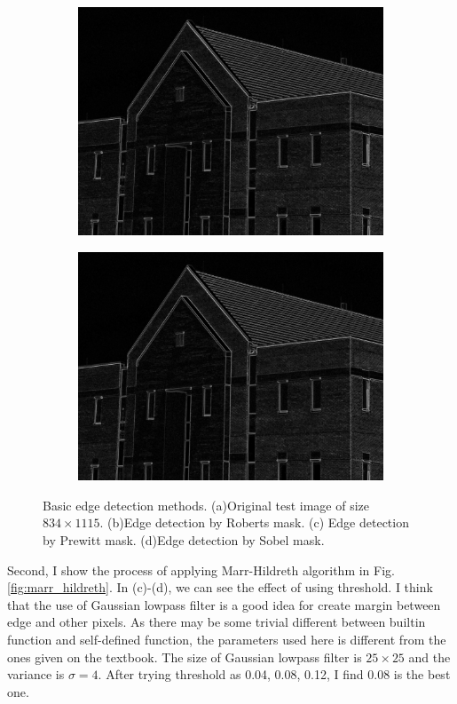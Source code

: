 \begin{figure}[h!]
\begin{subfigure}[b]{0.45\linewidth}
		\includegraphics[width=\linewidth]{myfigure/p9/9_prewitt.png}
		\caption{}
		\label{fig:prewitt}
	\end{subfigure}
	\begin{subfigure}[b]{0.45\linewidth}
    	\includegraphics[width=\linewidth]{myfigure/p9/9_sobel.png}
    	\caption{}
    	\label{fig:sobel}
  	\end{subfigure}
  	\caption{Basic edge detection methods. (a)Original test image of size $834 \times 1115$. (b)Edge detection by Roberts mask. (c) Edge detection by Prewitt mask. (d)Edge detection by Sobel mask.}
  	\label{fig:basic_edge}
\end{figure}

Second, I show the process of applying Marr-Hildreth algorithm in Fig.\ref{fig:marr_hildreth}. In (c)-(d), we can see the effect of using threshold. I think that the use of Gaussian lowpass filter is a good idea for create margin between edge and other pixels. As there may be some trivial different between builtin function and self-defined function, the parameters used here is different from the ones given on the textbook. The size of Gaussian lowpass filter is $25\times 25$ and the variance is $\sigma=4$. After trying threshold as 0.04, 0.08, 0.12, I find $0.08$ is the best one.\\

